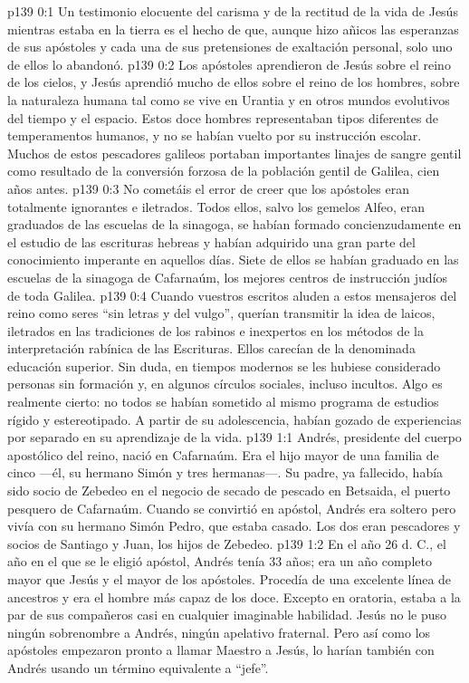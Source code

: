 \author{Comisión de seres intermedios}
\vs p139 0:1 Un testimonio elocuente del carisma y de la rectitud de la vida de Jesús mientras estaba en la tierra es el hecho de que, aunque hizo añicos las esperanzas de sus apóstoles y cada una de sus pretensiones de exaltación personal, solo uno de ellos lo abandonó.
\vs p139 0:2 Los apóstoles aprendieron de Jesús sobre el reino de los cielos, y Jesús aprendió mucho de ellos sobre el reino de los hombres, sobre la naturaleza humana tal como se vive en Urantia y en otros mundos evolutivos del tiempo y el espacio. Estos doce hombres representaban tipos diferentes de temperamentos humanos, y no se habían vuelto  por su instrucción escolar. Muchos de estos pescadores galileos portaban importantes linajes de sangre gentil como resultado de la conversión forzosa de la población gentil de Galilea, cien años antes.
\vs p139 0:3 \pc No cometáis el error de creer que los apóstoles eran totalmente ignorantes e iletrados. Todos ellos, salvo los gemelos Alfeo, eran graduados de las escuelas de la sinagoga, se habían formado concienzudamente en el estudio de las escrituras hebreas y habían adquirido una gran parte del conocimiento imperante en aquellos días. Siete de ellos se habían graduado en las escuelas de la sinagoga de Cafarnaúm, los mejores centros de instrucción judíos de toda Galilea.
\vs p139 0:4 Cuando vuestros escritos aluden a estos mensajeros del reino como seres “sin letras y del vulgo”, querían transmitir la idea de laicos, iletrados en las tradiciones de los rabinos e inexpertos en los métodos de la interpretación rabínica de las Escrituras. Ellos carecían de la denominada educación superior. Sin duda, en tiempos modernos se les hubiese considerado personas sin formación y, en algunos círculos sociales, incluso incultos. Algo es realmente cierto: no todos se habían sometido al mismo programa de estudios rígido y estereotipado. A partir de su adolescencia, habían gozado de experiencias por separado en su aprendizaje de la vida.
\vs p139 1:1 Andrés, presidente del cuerpo apostólico del reino, nació en Cafarnaúm. Era el hijo mayor de una familia de cinco ---él, su hermano Simón y tres hermanas---. Su padre, ya fallecido, había sido socio de Zebedeo en el negocio de secado de pescado en Betsaida, el puerto pesquero de Cafarnaúm. Cuando se convirtió en apóstol, Andrés era soltero pero vivía con su hermano Simón Pedro, que estaba casado. Los dos eran pescadores y socios de Santiago y Juan, los hijos de Zebedeo.
\vs p139 1:2 En el año 26 d. C., el año en el que se le eligió apóstol, Andrés tenía 33 años; era un año completo mayor que Jesús y el mayor de los apóstoles. Procedía de una excelente línea de ancestros y era el hombre más capaz de los doce. Excepto en oratoria, estaba a la par de sus compañeros casi en cualquier imaginable habilidad. Jesús no le puso ningún sobrenombre a Andrés, ningún apelativo fraternal. Pero así como los apóstoles empezaron pronto a llamar Maestro a Jesús, lo harían también con Andrés usando un término equivalente a “jefe”.
